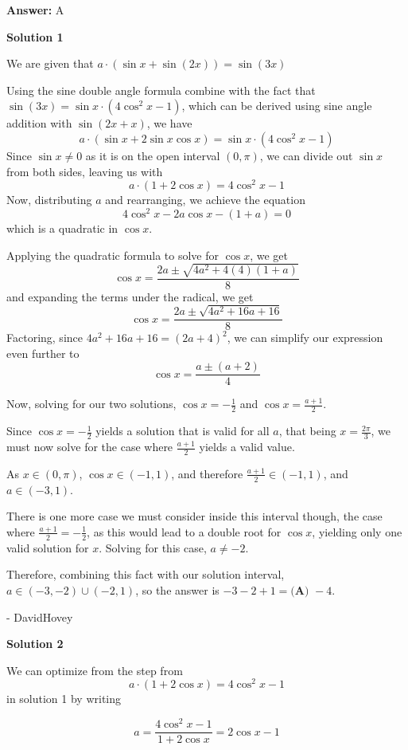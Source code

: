 \begin{enumerate}
 \textbf{Answer: }A



\textbf{Solution 1}

We are given that $a\cdot(\sin{x}+\sin{(2x)})=\sin{(3x)}$

 Using the sine double angle formula combine with the fact that $\sin{(3x)} = \sin{x}\cdot(4\cos^2{x}-1)$, which can be derived using sine angle addition with $\sin{(2x + x)}$, we have 
 \[a\cdot(\sin{x}+2\sin{x}\cos{x})=\sin{x}\cdot(4\cos^2{x}-1)\]Since $\sin{x} \ne 0$ as it is on the open interval $(0, \pi)$, we can divide out $\sin{x}$ from both sides, leaving us with 
 \[a\cdot(1+2\cos{x})=4\cos^2{x}-1\]Now, distributing $a$ and rearranging, we achieve the equation 
 \[4\cos^2{x} - 2a\cos{x} - (1+a) = 0\] which is a quadratic in $\cos{x}$.

 Applying the quadratic formula to solve for $\cos{x}$, we get 
 \[\cos{x} =\frac{2a\pm\sqrt{4a^2+4(4)(1+a)}}{8}\] and expanding the terms under the radical, we get 
 \[\cos{x} =\frac{2a\pm\sqrt{4a^2+16a+16}}{8}\]Factoring, since $4a^2+16a+16 = (2a+4)^2$, we can simplify our expression even further to 
 \[\cos{x} =\frac{a\pm(a+2)}{4}\]

 Now, solving for our two solutions,  $\cos{x} = -\frac{1}{2}$ and $\cos{x} = \frac{a+1}{2}$.

 Since $\cos{x} = -\frac{1}{2}$ yields a solution that is valid for all $a$, that being $x = \frac{2\pi}{3}$, we must now solve for the case where $\frac{a+1}{2}$ yields a valid value.

 As $x\in (0, \pi)$, $\cos{x}\in (-1, 1)$, and therefore $\frac{a+1}{2}\in (-1, 1)$, and $a\in(-3,1)$.

 There is one more case we must consider inside this interval though, the case where $\frac{a+1}{2} = -\frac{1}{2}$, as this would lead to a double root for $\cos{x}$, yielding only one valid solution for $x$. Solving for this case, $a \ne -2$.

 Therefore, combining this fact with our solution interval, $a\in(-3, -2) \cup (-2, 1)$, so the answer is $-3-2+1 = \boxed{\textbf{(A) } {-}4}$.

 - DavidHovey

 



\textbf{Solution 2}

We can optimize from the step from 
 \[a\cdot(1+2\cos{x})=4\cos^2{x}-1\] in solution 1 by writing

 
 \[a = \frac{4\cos^2{x}-1}{1+2\cos{x}} = 2\cos x - 1\]


\end{enumerate}
